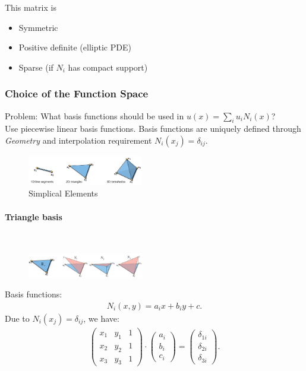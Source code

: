 \begin{multicols}{2}
This matrix is
\begin{itemize}
	\item Symmetric
	\item Positive definite (elliptic PDE)
	\item Sparse (if $N_i$ has compact support)
\end{itemize}


\subsubsection{Choice of the Function Space}
Problem: What basis functions should be used in $u(x) = \sum_i u_i N_i(x)$?\\
Use piecewise linear basis functions. Basis functions are uniquely defined through \emph{Geometry} and interpolation requirement $N_i(x_j) = \delta_{ij}$.
\begin{figure}[H]
	\centering
	\includegraphics[width=0.45\textwidth]{img/03_elements}
	\caption{Simplical Elements}
\end{figure}

\paragraph{Triangle basis} $\text{}$
\begin{figure}[H]
	\centering
	\includegraphics[width=0.45\textwidth]{img/03_triangle_basis}
\end{figure}
Basis functions: 
\begin{align*}
	N_i(x,y) = a_ix + b_iy + c.
\end{align*}
Due to $N_i(x_j) = \delta_{ij}$, we have:
\begin{align*}
	\begin{pmatrix}
		x_1 & y_1 & 1\\
		x_2 & y_2 & 1\\
		x_3 & y_3 & 1
	\end{pmatrix} \cdot
	\begin{pmatrix}
	a_i \\ b_i \\ c_i
	\end{pmatrix}
	= 
	\begin{pmatrix}
		\delta_{1i}\\
		\delta_{2i}\\
		\delta_{3i}
	\end{pmatrix}.
\end{align*}


\end{multicols}
